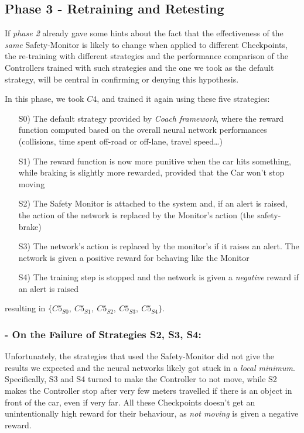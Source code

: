 \subsection{Phase 3 - Retraining and Retesting}

If \textsl{phase 2} already gave some hints about the fact that the effectiveness of the \textsl{same} Safety-Monitor is likely to change when applied to different Checkpoints, the re-training with different strategies and the performance comparison of the Controllers trained with such strategies and the one we took as the default strategy, will be central in confirming or denying this hypothesis.

In this phase, we took $C4$, and trained it again using these five strategies:

\begin{itemize}
	\item[S0)] The default strategy provided by \textsl{Coach framework}, where the reward function computed based on the overall neural network performances (collisions, time spent off-road or off-lane, travel speed\dots)
	\item[S1)] The reward function is now more punitive when the car hits something, while braking is slightly more rewarded, provided that the Car won't stop moving
	\item[S2)] The Safety Monitor is attached to the system and, if an alert is raised, the action of the network is replaced by the Monitor's action (the safety-brake)
	\item[S3)] The network's action is replaced by the monitor's if it raises an alert. The network is given a positive reward for behaving like the Monitor
	\item[S4)] The training step is stopped and the network is given a \textsl{negative} reward if an alert is raised
\end{itemize}

resulting in $\{C5_{S0},\: C5_{S1},\: C5_{S2},\: C5_{S3},\: C5_{S4}\}$.

\subsubsection{- On the Failure of Strategies S2, S3, S4:}

Unfortunately, the strategies that used the Safety-Monitor did not give the results we expected and the neural networks likely got stuck in a \textsl{local minimum}. Specifically, S3 and S4 turned to make the Controller to not move, while S2 makes the Controller stop after very few meters travelled if there is an object in front of the car, even if very far. All these Checkpoints doesn't get an unintentionally high reward for their behaviour, as \textsl{not moving} is given a negative reward.

